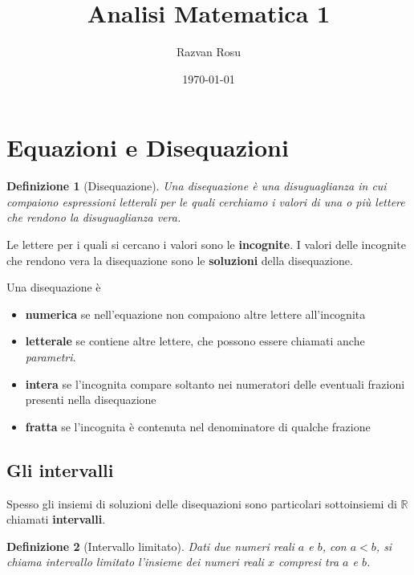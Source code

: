 \documentclass[12pt, letterpaper]{article}
\title{Analisi Matematica 1}
\author{Razvan Rosu}
\date{\today}
\newtheorem{definition}{Definizione}[section]
\begin{document}
	\begin{titlepage}
		\maketitle
	\end{titlepage}

	\section{Equazioni e Disequazioni}
	
	\begin{definition}[Disequazione]
		Una disequazione è una disuguaglianza in cui compaiono espressioni letterali per le quali cerchiamo i valori di una o più lettere che rendono la disuguaglianza vera.
	\end{definition}
	
	Le lettere per i quali si cercano i valori sono le \textbf{incognite}. I valori delle incognite che rendono vera la disequazione sono le \textbf{soluzioni} della disequazione. \par
	Una disequazione è
	
	\begin{itemize}
		\item \textbf{numerica} se nell'equazione non compaiono altre lettere all'incognita
		\item \textbf{letterale} se contiene altre lettere, che possono essere chiamati anche \textit{parametri}.
		\item \textbf{intera} se l'incognita compare soltanto nei numeratori delle eventuali frazioni presenti nella disequazione
		\item \textbf{fratta} se l'incognita è contenuta nel denominatore di qualche frazione
	\end{itemize}

	\subsection{Gli intervalli}
	
	Spesso gli insiemi di soluzioni delle disequazioni sono particolari sottoinsiemi di $\mathbb{R}$ chiamati \textbf{intervalli}.
	
	\begin{definition}[Intervallo limitato]
		Dati due numeri reali $a$ e $b$, con $a < b$, si chiama intervallo limitato l'insieme dei numeri reali $x$ compresi tra $a$ e $b$. 
	\end{definition}
\end{document}

